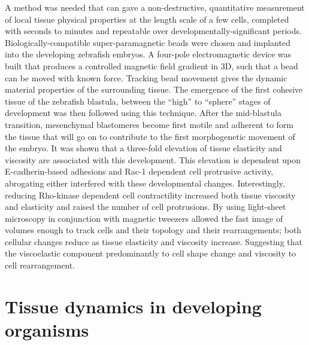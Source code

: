 A method was needed that can gave a non-destructive, quantitative measurement of local tissue physical properties at the length scale of a few cells, completed with seconds to minutes and repeatable over developmentally-significant periods.
Biologically-compatible super-paramagnetic beads were chosen and implanted into the developing zebrafish embryos.
A four-pole electromagnetic device was built that produces a controlled magnetic field gradient in 3D, such that a bead can be moved with known force.
Tracking bead movement gives the dynamic material properties of the surrounding tissue.
The emergence of the first cohesive tissue of the zebrafish blastula, between the “high” to “sphere” stages of development was then followed using this technique.
After the mid-blastula transition, mesenchymal blastomeres become first motile and adherent to form the tissue that will go on to contribute to the first morphogenetic movement of the embryo.
It was shown that a three-fold elevation of tissue elasticity and viscosity are associated with this development.
This elevation is dependent upon E-cadherin-based adhesions and Rac-1 dependent cell protrusive activity, abrogating either interfered with these developmental changes.
Interestingly, reducing Rho-kinase dependent cell contractility increased both tissue viscosity and elasticity and raised the number of cell protrusions.
By using light-sheet microscopy in conjunction with magnetic tweezers allowed the fast image of volumes enough to track cells and their topology and their rearrangements; both cellular changes reduce as tissue elasticity and viscosity increase.
Suggesting that the viscoelastic component predominantly to cell shape change and viscosity to cell rearrangement.

\section{Tissue dynamics in developing organisms}


